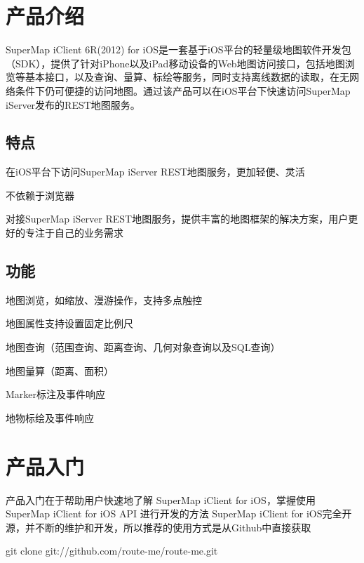 \hypertarget{index_产品介绍}{}\section{产品介绍}\label{index_产品介绍}
Super\-Map i\-Client 6\-R(2012) for i\-O\-S是一套基于i\-O\-S平台的轻量级地图软件开发包（\-S\-D\-K），提供了针对i\-Phone以及i\-Pad移动设备的\-Web地图访问接口，包括地图浏览等基本接口，以及查询、量算、标绘等服务，同时支持离线数据的读取，在无网络条件下仍可便捷的访问地图。通过该产品可以在i\-O\-S平台下快速访问\-Super\-Map i\-Server发布的\-R\-E\-S\-T地图服务。 \hypertarget{index_特点}{}\subsection{特点}\label{index_特点}

\begin{DoxyItemize}
\item 在i\-O\-S平台下访问\-Super\-Map i\-Server R\-E\-S\-T地图服务，更加轻便、灵活
\item 不依赖于浏览器
\item 对接\-Super\-Map i\-Server R\-E\-S\-T地图服务，提供丰富的地图框架的解决方案，用户更好的专注于自己的业务需求 
\end{DoxyItemize}\hypertarget{index_功能}{}\subsection{功能}\label{index_功能}

\begin{DoxyItemize}
\item 地图浏览，如缩放、漫游操作，支持多点触控
\item 地图属性支持设置固定比例尺
\item 地图查询（范围查询、距离查询、几何对象查询以及\-S\-Q\-L查询）
\item 地图量算（距离、面积）
\item Marker标注及事件响应
\item 地物标绘及事件响应 
\end{DoxyItemize}\hypertarget{index_产品入门}{}\section{产品入门}\label{index_产品入门}
产品入门在于帮助用户快速地了解 Super\-Map i\-Client for i\-O\-S，掌握使用 Super\-Map i\-Client for i\-O\-S A\-P\-I 进行开发的方法 Super\-Map i\-Client for i\-O\-S完全开源，并不断的维护和开发，所以推荐的使用方式是从\-Github中直接获取 \begin{DoxyVerb} git clone git://github.com/route-me/route-me.git\end{DoxyVerb}


